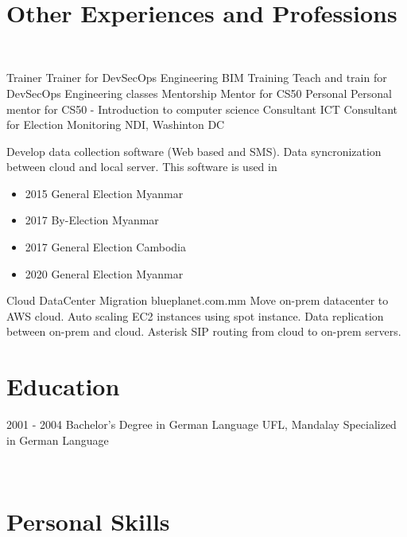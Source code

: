 \documentclass[]{friggeri-cv}
\begin{document}
\newpage
~

\section{Other Experiences and Professions}
~
\begin{entrylist}
  \entry
  {Trainer}
  {Trainer for DevSecOps Engineering}
  {BIM Training}
  {Teach and train for DevSecOps Engineering classes}
  \entry
  {Mentorship}
  {Mentor for CS50}
  {Personal}
  {Personal mentor for CS50 - Introduction to computer science}
  \entry
  {Consultant}
  {ICT Consultant for Election Monitoring}
  {NDI, Washinton DC}
  {Develop data collection software (Web based and SMS). Data syncronization between cloud and local server. This software is used in 
    \begin{itemize}
      \item 2015 General Election Myanmar
      \item 2017 By-Election Myanmar
      \item 2017 General Election Cambodia
      \item 2020 General Election Myanmar
    \end{itemize}}
  \entry
  {Cloud}
  {DataCenter Migration}
  {blueplanet.com.mm}
  {Move on-prem datacenter to AWS cloud. Auto scaling EC2 instances using spot instance. Data replication between on-prem and cloud. Asterisk SIP routing from cloud to on-prem servers.\\}
\end{entrylist}
\section{Education}
\begin{entrylist}
  \entry
    {2001 - 2004}
    {Bachelor's Degree in German Language}
    {UFL, Mandalay}
    {Specialized in German Language\\ }
\end{entrylist}


\begin{aside}
~
~
~
~
  \section{Personal Skills}
~
\end{aside}
\end{document}
